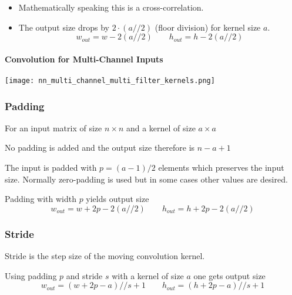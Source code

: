 \newpar{}
\begin{itemize}
    \item Mathematically speaking this is a cross-correlation.
    \item The output size drops by $2\cdot (a//2)$ (floor division) for kernel size $a$.
          \begin{equation*}
              w_{out}=  w-2(a//2) \qquad
              h_{out}=  h-2(a//2)
          \end{equation*}
\end{itemize}

\paragraph{Convolution for Multi-Channel Inputs}
\begin{center}
    \texttt{[image: nn\_multi\_channel\_multi\_filter\_kernels.png]}
\end{center}

\subsubsection{Padding}

For an input matrix of size $n\times n$ and a kernel of size $a\times a$

\newpar{}

No padding is added and the output size therefore is $n-a+1$

\newpar{}

The input is padded with $p=(a-1)/2$ elements which preserves the input size. Normally zero-padding is used but in some cases other values are desired.

\newpar{}

Padding with width $p$ yields output size
\begin{equation*}
    w_{out}=  w+2p-2(a//2) \qquad
    h_{out}=  h+2p-2(a//2)
\end{equation*}

\subsubsection{Stride}
Stride is the step size of the moving convolution kernel.

Using padding $p$ and stride $s$ with a kernel of size $a$ one gets output size
\begin{equation*}
    w_{out}= (w+2p-a)//s + 1 \qquad
    h_{out}= (h+2p-a)//s + 1
\end{equation*}


